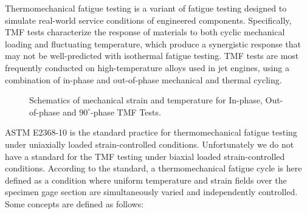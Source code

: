 Thermomechanical fatigue testing is a variant of fatigue testing designed to simulate real-world service conditions of engineered components.
Specifically, TMF tests characterize the response of materials to both cyclic mechanical loading and fluctuating temperature, which produce a synergistic response that may not be well-predicted with isothermal fatigue testing.
TMF tests are most frequently conducted on high-temperature alloys used in jet engines, using a combination of in-phase and out-of-phase mechanical and thermal cycling.

\begin{figure}[!htp]
\centering{}
\caption{Schematics of mechanical strain and temperature for In-phase, Out-of-phase and $90^\circ$-phase TMF Tests.}
\label{Fig:Thermomechanical_phase}
\end{figure}

ASTM E2368-10\cite{ASTME2005} is the standard practice for thermomechanical fatigue testing under uniaxially loaded strain-controlled conditions.
Unfortunately we do not have a standard for the TMF testing under biaxial loaded strain-controlled conditions.
According to the standard, a thermomechanical fatigue cycle is here defined as a condition where uniform temperature and strain fields over the specimen gage section are simultaneously varied and independently controlled.
Some concepts are defined as follows:

